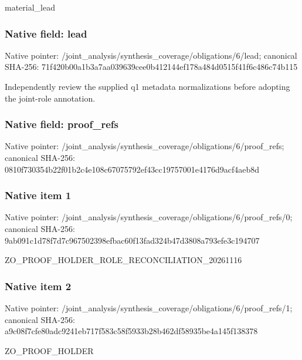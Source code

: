 \documentclass[10pt,a4paper]{article}
\begin{document}
\begingroup\raggedright\sloppy material\_\allowbreak{}lead\par\endgroup

\subsubsection{Native field: lead}
Native pointer: /joint\_\allowbreak{}analysis/synthesis\_\allowbreak{}coverage/obligations/6/lead; canonical SHA-256: 71f420b00a1b3a7aa039639cee0b412144ef178a484d0515f41f6c486c74b115

\begingroup\raggedright\sloppy Independently review the supplied q1 metadata normalizations before adopting the joint-role annotation.\par\endgroup

\subsubsection{Native field: proof\_\allowbreak{}refs}
Native pointer: /joint\_\allowbreak{}analysis/synthesis\_\allowbreak{}coverage/obligations/6/proof\_\allowbreak{}refs; canonical SHA-256: 0810f730354b22f01b2c4e108c67075792ef43cc19757001e4176d9acf4aeb8d

\subsubsection{Native item 1}
Native pointer: /joint\_\allowbreak{}analysis/synthesis\_\allowbreak{}coverage/obligations/6/proof\_\allowbreak{}refs/0; canonical SHA-256: 9ab091c1d78f7d7c967502398efbac60f13fad324b47d3808a793efe3c194707

\begingroup\raggedright\sloppy ZO\_\allowbreak{}PROOF\_\allowbreak{}HOLDER\_\allowbreak{}ROLE\_\allowbreak{}RECONCILIATION\_\allowbreak{}20261116\par\endgroup

\subsubsection{Native item 2}
Native pointer: /joint\_\allowbreak{}analysis/synthesis\_\allowbreak{}coverage/obligations/6/proof\_\allowbreak{}refs/1; canonical SHA-256: a9c08f7cfe80adc9241eb717f583c58f5933b28b462df58935be4a145f138378

\begingroup\raggedright\sloppy ZO\_\allowbreak{}PROOF\_\allowbreak{}HOLDER\par\endgroup
\end{document}

